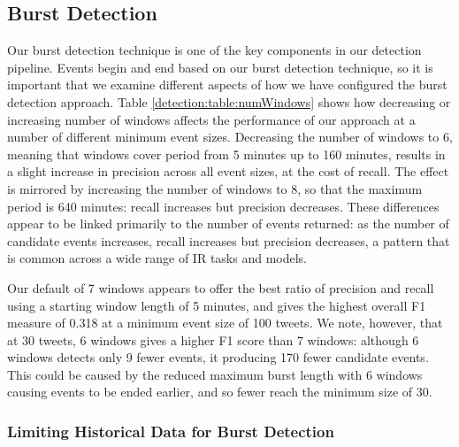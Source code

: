 \subsection{Burst Detection}
Our burst detection technique is one of the key components in our detection pipeline.
Events begin and end based on our burst detection technique, so it is important that we examine different aspects of how we have configured the burst detection approach.
Table \ref{detection:table:numWindows} shows how decreasing or increasing number of windows affects the performance of our approach at a number of different minimum event sizes.
Decreasing the number of windows to 6, meaning that windows cover period from 5 minutes up to 160 minutes, results in a slight increase in precision across all event sizes, at the cost of recall.
The effect is mirrored by increasing the number of windows to 8, so that the maximum period is 640 minutes: recall increases but precision decreases.
These differences appear to be linked primarily to the number of events returned: as the number of candidate events increases, recall increases but precision decreases, a pattern that is common across a wide range of IR tasks and models.

Our default of 7 windows appears to offer the best ratio of precision and recall using a starting window length of 5 minutes, and gives the highest overall F1 measure of 0.318 at a minimum event size of 100 tweets.
We note, however, that at 30 tweets, 6 windows gives a higher F1 score than 7 windows: although 6 windows detects only 9 fewer events, it producing 170 fewer candidate events.
This could be caused by the reduced maximum burst length with 6 windows causing events to be ended earlier, and so fewer reach the minimum size of 30.



\subsubsection{Limiting Historical Data for Burst Detection}

